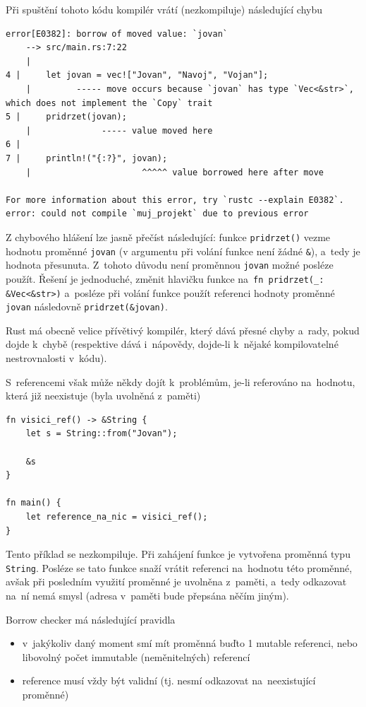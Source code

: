 \documentclass[a4paper, 12pt]{article} %
\newcommand{\rust}[1]{\texttt{#1}}
\begin{document}
			Při spuštění tohoto kódu kompilér vrátí (nezkompiluje) následující chybu
			\begin{verbatim}
error[E0382]: borrow of moved value: `jovan`
	--> src/main.rs:7:22
	|
4 |     let jovan = vec!["Jovan", "Navoj", "Vojan"];
	|         ----- move occurs because `jovan` has type `Vec<&str>`, which does not implement the `Copy` trait
5 |     pridrzet(jovan);    
	|              ----- value moved here
6 | 
7 |     println!("{:?}", jovan);
	|                      ^^^^^ value borrowed here after move

For more information about this error, try `rustc --explain E0382`.
error: could not compile `muj_projekt` due to previous error
			\end{verbatim}
				
			Z chybového hlášení lze jasně přečíst následující: funkce \rust{pridrzet()} vezme hodnotu proměnné \texttt{jovan} (v argumentu při volání funkce není žádné \rust{&}), a~tedy je hodnota přesunuta. Z~tohoto důvodu není proměnnou \texttt{jovan} možné posléze použít. Řešení je jednoduché, změnit hlavičku funkce na~\rust{fn pridrzet(_: &Vec<&str>)} a~posléze při volání funkce použít referenci hodnoty proměnné \texttt{jovan} následovně \rust{pridrzet(&jovan)}.
				
			Rust má obecně velice přívětivý kompilér, který dává přesné chyby a~rady, pokud dojde k~chybě (respektive dává i~nápovědy, dojde-li k~nějaké kompilovatelné nestrovnalosti v~kódu).
			
			S~referencemi však může někdy dojít k~problémům, je-li referováno na~hodnotu, která již neexistuje (byla uvolněná z~paměti)
			\begin{verbatim}
fn visici_ref() -> &String {
	let s = String::from("Jovan");

	&s
}

fn main() {
	let reference_na_nic = visici_ref();
}
			\end{verbatim}
			\cite{dangle}
				
			Tento příklad se nezkompiluje. Při zahájení funkce je vytvořena proměnná typu \rust{String}. Posléze se tato funkce snaží vrátit referenci na~hodnotu této proměnné, avšak při posledním využití proměnné je uvolněna z~paměti, a~tedy odkazovat na~ní nemá smysl (adresa v~paměti bude přepsána něčím jiným).
	
			Borrow checker má následující pravidla
			\begin{itemize}
				\item v~jakýkoliv daný moment smí mít proměnná buďto 1 mutable referenci, nebo libovolný počet immutable (neměnitelných) referencí
				\item reference musí vždy být validní (tj. nesmí odkazovat na~neexistující proměnné)
			\end{itemize}
	
\end{document}
